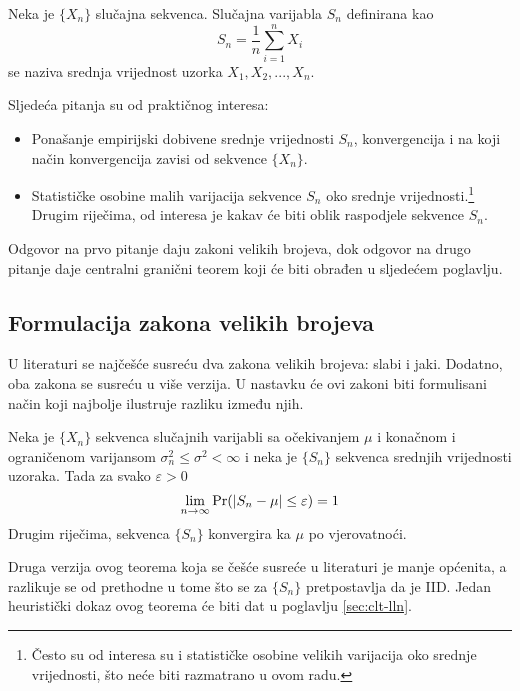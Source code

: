 \begin{definition}

  Neka je $\{X_n\}$ slučajna sekvenca. Slučajna varijabla $S_n$
  definirana kao 
  \begin{equation} \label{eq:sample-mean}
    S_n = \frac{1}{n} \sum_{i=1}^{n} X_i
  \end{equation}
  se naziva srednja vrijednost uzorka $X_1,X_2,...,X_n$.

\end{definition}
%
Sljedeća pitanja su od praktičnog interesa:

\begin{itemize}
  \item Ponašanje empirijski dobivene srednje vrijednosti $S_n$, konvergencija i
    na koji način konvergencija zavisi od sekvence $\{X_n\}$.
  \item Statističke osobine malih varijacija sekvence $S_n$ oko srednje
    vrijednosti.\footnote{Često su od interesa su i statističke osobine velikih
    varijacija oko srednje vrijednosti, što neće biti razmatrano u ovom radu.}
    Drugim riječima, od interesa je kakav će biti oblik raspodjele sekvence $S_n$.
\end{itemize}

Odgovor na prvo pitanje daju zakoni velikih brojeva, dok odgovor na drugo
pitanje daje centralni granični teorem koji će biti obrađen u sljedećem
poglavlju.

\subsection{Formulacija zakona velikih brojeva}%

 U literaturi se najčešće susreću dva zakona velikih brojeva: slabi i
jaki. Dodatno, oba zakona se susreću u više verzija. U nastavku će ovi zakoni
biti formulisani način koji najbolje ilustruje razliku između njih.

\begin{theorem}
  Neka je $\{X_n\}$ sekvenca slučajnih varijabli sa očekivanjem $\mu$ i konačnom
  i ograničenom varijansom $\sigma_n^2 \le \sigma^2 < \infty$ i neka je
  $\{S_n\}$ sekvenca srednjih vrijednosti uzoraka. Tada za svako
  $\varepsilon>0$
  \begin{equation}
    \lim_{n\to\infty} \mathrm{Pr}(|S_n - \mu| \le \varepsilon) = 1
  \end{equation}
  Drugim riječima, sekvenca $\{S_n\}$ konvergira ka $\mu$ po vjerovatnoći.
\end{theorem}
Druga verzija ovog teorema koja se češće susreće u literaturi je manje općenita,
a razlikuje se od prethodne u tome što se za $\{S_n\}$ pretpostavlja da je IID.
Jedan heuristički dokaz ovog teorema će biti dat u poglavlju \ref{sec:clt-lln}.

